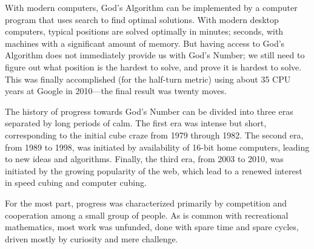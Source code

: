 With modern computers, God's Algorithm can be implemented by a
computer program that uses search to find optimal solutions.  With
modern desktop computers, typical positions are solved optimally in
minutes; seconds, with machines with a significant amount of memory.
But having access to God's Algorithm does not immediately provide
us with God's Number; we still need to figure out what position is
the hardest to solve, and prove it is hardest to solve.  This was
finally accomplished (for the half-turn metric) using about 35 CPU
years at Google in 2010---the final result was twenty moves.

The history of
progress towards God's Number can be divided into three eras separated
by long periods of calm.  The first era was intense but short,
corresponding to the initial cube craze from 1979 through 1982.
The second era, from 1989 to 1998, was
initiated by availability of 16-bit home computers, leading to new
ideas and algorithms.  Finally, the third era, from 2003 to 2010,
was initiated by the growing popularity of the web,
which lead to a renewed interest in speed cubing and computer
cubing.

For the most part, progress was characterized primarily by competition
and cooperation among a small group of people.  As is common with
recreational mathematics, most work was unfunded, done with spare
time and spare cycles, driven mostly by curiosity and mere
challenge.
\bye
